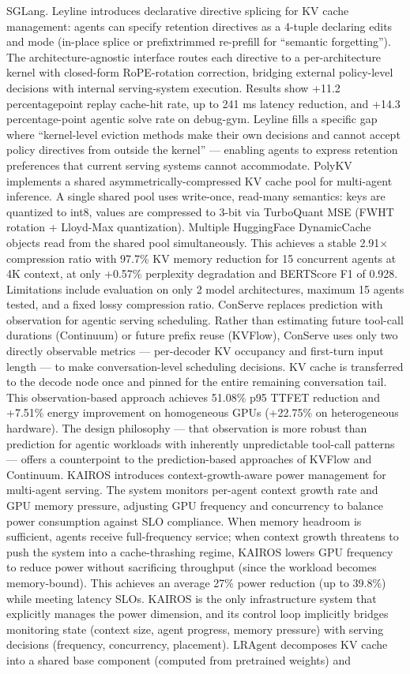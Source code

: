 \documentclass[preprint,12pt]{elsarticle}
\begin{document}
SGLang. Leyline introduces declarative directive splicing for KV cache management: agents can specify retention directives as a 4-tuple declaring edits and mode (in-place splice or prefixtrimmed re-prefill for ``semantic forgetting''). The architecture-agnostic interface routes each directive to a per-architecture kernel with closed-form RoPE-rotation correction, bridging external policy-level decisions with internal serving-system execution. Results show +11.2 percentagepoint replay cache-hit rate, up to 241 ms latency reduction, and +14.3 percentage-point agentic solve rate on debug-gym. Leyline fills a specific gap where ``kernel-level eviction methods make their own decisions and cannot accept policy directives from outside the kernel'' --- enabling agents to express retention preferences that current serving systems cannot accommodate. PolyKV implements a shared asymmetrically-compressed KV cache pool for multi-agent inference. A single shared pool uses write-once, read-many semantics: keys are quantized to int8, values are compressed to 3-bit via TurboQuant MSE (FWHT rotation + Lloyd-Max quantization). Multiple HuggingFace DynamicCache objects read from the shared pool simultaneously. This achieves a stable 2.91$\times$ compression ratio with 97.7\% KV memory reduction for 15 concurrent agents at 4K context, at only +0.57\% perplexity degradation and BERTScore F1 of 0.928. Limitations include evaluation on only 2 model architectures, maximum 15 agents tested, and a fixed lossy compression ratio. ConServe replaces prediction with observation for agentic serving scheduling. Rather than estimating future tool-call durations (Continuum) or future prefix reuse (KVFlow), ConServe uses only two directly observable metrics --- per-decoder KV occupancy and first-turn input length --- to make conversation-level scheduling decisions. KV cache is transferred to the decode node once and pinned for the entire remaining conversation tail. This observation-based approach achieves 51.08\% p95 TTFET reduction and +7.51\% energy improvement on homogeneous GPUs (+22.75\% on heterogeneous hardware). The design philosophy --- that observation is more robust than prediction for agentic workloads with inherently unpredictable tool-call patterns --- offers a counterpoint to the prediction-based approaches of KVFlow and Continuum. KAIROS \cite{v5ref44} introduces context-growth-aware power management for multi-agent serving. The system monitors per-agent context growth rate and GPU memory pressure, adjusting GPU frequency and concurrency to balance power consumption against SLO compliance. When memory headroom is sufficient, agents receive full-frequency service; when context growth threatens to push the system into a cache-thrashing regime, KAIROS lowers GPU frequency to reduce power without sacrificing throughput (since the workload becomes memory-bound). This achieves an average 27\% power reduction (up to 39.8\%) while meeting latency SLOs. KAIROS is the only infrastructure system that explicitly manages the power dimension, and its control loop implicitly bridges monitoring state (context size, agent progress, memory pressure) with serving decisions (frequency, concurrency, placement). LRAgent decomposes KV cache into a shared base component (computed from pretrained weights) and 
\end{document}
